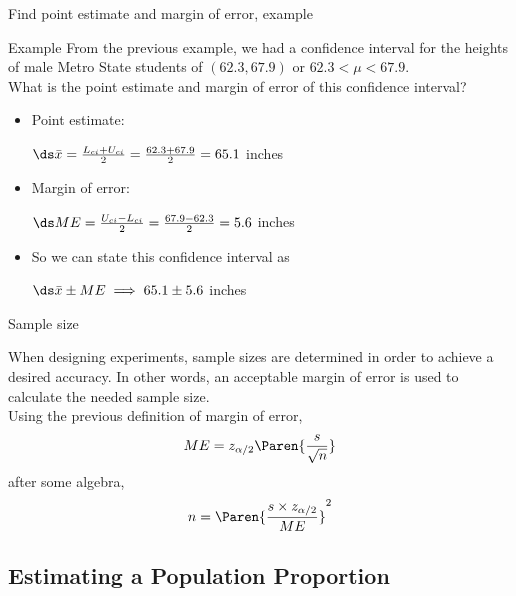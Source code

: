 \documentclass[xcolor=table]{beamer}
\begin{document}
\begin{frame}{Find point estimate and margin of error, example}
\begin{exampleblock}{Example}
From the previous example, we had a confidence interval for the heights of male Metro State students of $(62.3, 67.9)$ or $62.3 < \mu < 67.9$.\\
\medskip
 What is the point estimate and margin of error of this confidence interval?\\
\medskip
\begin{itemize}
\pause\item Point estimate:\\
\smallskip
{\centering
$\ds \bar x = \frac {L_{ci} + U_{ci}}{2} = \frac {62.3 + 67.9}{2} = 65.1$ inches
\par}
\smallskip
\pause\item Margin of error:\\
\smallskip
{\centering
$\ds ME = \frac {U_{ci} - L_{ci}}{2} = \frac {67.9 - 62.3}{2} = 5.6$ inches
\par}
\smallskip
\pause\item So we can state this confidence interval as\\
\smallskip
{\centering
$\ds \bar x \pm ME \implies 65.1 \pm 5.6$ inches
\par}

\end{itemize}
\medskip
\end{exampleblock}

\end{frame}

\begin{frame}{Sample size}
\begin{block}{}
\large
When designing experiments, sample sizes are determined in order to achieve a desired accuracy. In other words, an acceptable margin of error is used to calculate the needed sample size.\\
\pause\medskip
Using the previous definition of margin of error,
\[ME = z_{\alpha/2} \Paren{\frac s {\sqrt n}}\]
after some algebra,
\[ n = \Paren{\frac {s \times z_{\alpha/2}}{ME}}^2\]
\end{block}
\end{frame}

\subsection{Estimating a Population Proportion}
\end{document}
